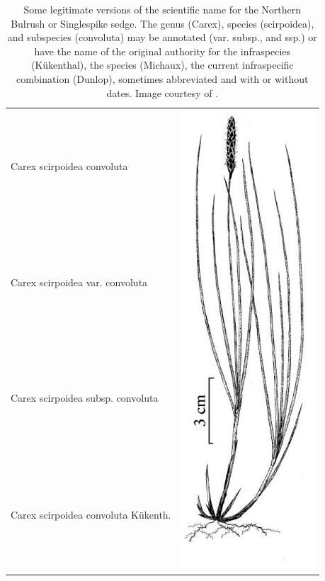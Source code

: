\documentclass{bmcart}
\begin{document}
\begin{table}[!htb]
  \begin{center}
  \caption{Some legitimate versions of the scientific name for the Northern
    Bulrush or Singlespike sedge.  The genus (Carex), species (scirpoidea), and
    subspecies (convoluta) may be annotated (var. subsp., and ssp.) or have the
    name of the original authority for the infraspecies (Kükenthal), the species
    (Michaux), the current infraspecific combination (Dunlop), sometimes
    abbreviated and with or without dates. Image courtesy of \cite{FNA2002}.
  }\label{table:carex}
    \begin{tabular}{| l | c |}
    \hline
    Carex scirpoidea convoluta &
    \multirow{24}{*}{\includegraphics[scale=0.3]{images/carex.png}} \\
    Carex scirpoidea var. convoluta & \\
    Carex scirpoidea subsp. convoluta & \\
    Carex scirpoidea convoluta Kükenth. & \\

\end{tabular}
\end{center}
\end{table}
\end{document}
